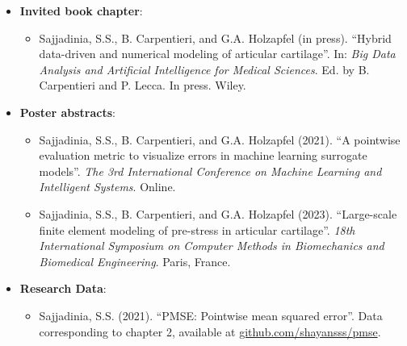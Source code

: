 \documentclass[12pt,a4paper]{report}
\begin{document}
\begin{itemize}
\begin{itemize}
\end{itemize}
\item \textbf{Invited book chapter}:
\begin{itemize}
    \item Sajjadinia, S.S., B. Carpentieri, and G.A. Holzapfel (in press). “Hybrid data-driven and numerical modeling of articular cartilage”. In: \textit{Big Data Analysis and Artificial Intelligence for Medical Sciences}. Ed. by B. Carpentieri and P. Lecca. In press. Wiley.
\end{itemize}
\item \textbf{Poster abstracts}:
\begin{itemize}
    \item Sajjadinia, S.S., B. Carpentieri, and G.A. Holzapfel (2021). “A pointwise evaluation metric to visualize errors in machine learning surrogate models”. \textit{The 3rd International Conference on Machine Learning and Intelligent Systems}. Online.
    \item Sajjadinia, S.S., B. Carpentieri, and G.A. Holzapfel (2023). “Large-scale finite element modeling of pre-stress in articular cartilage”. \textit{18th International Symposium on Computer Methods in Biomechanics and Biomedical Engineering}. Paris, France.
\end{itemize}
\item \textbf{Research Data}:
\begin{itemize}
    \item Sajjadinia, S.S. (2021). “PMSE: Pointwise mean squared error”. Data corresponding to chapter 2, available at \href{https://github.com/shayansss/pmse}{github.com/shayansss/pmse}.

\end{itemize}
\end{itemize}
\end{document}
